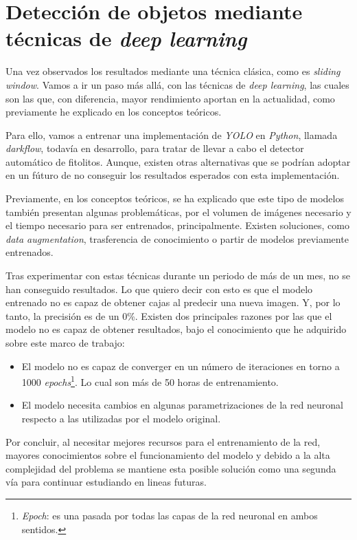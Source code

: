\section{Detección de objetos mediante técnicas de \textit{deep learning}}

Una vez observados los resultados mediante una técnica clásica, como es \textit{sliding window}. Vamos a ir un paso más allá, con las técnicas de \textit{deep learning}, las cuales son las que, con diferencia, mayor rendimiento aportan en la actualidad, como previamente he explicado en los conceptos teóricos.

Para ello, vamos a entrenar una implementación de \textit{YOLO} en \textit{Python}, llamada \textit{darkflow}, todavía en desarrollo, para tratar de llevar a cabo el detector automático de fitolitos. Aunque, existen otras alternativas que se podrían adoptar en un fúturo de no conseguir los resultados esperados con esta implementación.

Previamente, en los conceptos teóricos, se ha explicado que este tipo de modelos también presentan algunas problemáticas, por el volumen de imágenes necesario y el tiempo necesario para ser entrenados, principalmente. Existen soluciones, como \textit{data augmentation}, trasferencia de conocimiento o partir de modelos previamente entrenados.

Tras experimentar con estas técnicas durante un periodo de más de un mes, no se han conseguido resultados. Lo que quiero decir con esto es que el modelo entrenado no es capaz de obtener cajas al predecir una nueva imagen. Y, por lo tanto, la precisión es de un 0\%. Existen dos principales razones por las que el modelo no es capaz de obtener resultados, bajo el conocimiento que he adquirido sobre este marco de trabajo:

\begin{itemize}
	\item El modelo no es capaz de converger en un número de iteraciones en torno a 1000 \textit{epochs}\footnote{\textit{Epoch}: es una pasada por todas las capas de la red neuronal en ambos sentidos.}. Lo cual son más de 50 horas de entrenamiento.
	\item El modelo necesita cambios en algunas parametrizaciones de la red neuronal respecto a las utilizadas por el modelo original.
\end{itemize}

Por concluir, al necesitar mejores recursos para el entrenamiento de la red, mayores conocimientos sobre el funcionamiento del modelo y debido a la alta complejidad del problema se mantiene esta posible solución como una segunda vía para continuar estudiando en lineas futuras.

